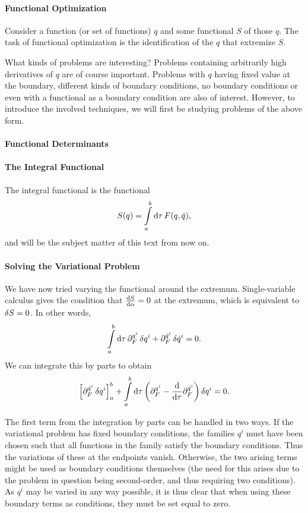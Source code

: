 \paragraph{Functional Optimization}
Consider a function (or set of functions) $q$ and some functional $S$ of those $q$. The task of functional optimization is the identification of the $q$ that extremize $S$.

What kinds of problems are interesting? Problems containing arbitrarily high derivatives of $q$ are of course important. Problems with $q$ having fixed value at the boundary, different kinds of boundary conditions, no boundary conditions or even with a functional as a boundary condition are also of interest. However, to introduce the involved techniques, we will first be studying problems of the above form.

\paragraph{Functional Determinants}

\paragraph{The Integral Functional}
The integral functional is the functional
\begin{align*}
	S(q) = \int\limits_{a}^{b}\dd{\tau}{F(q, \dot{q})},
\end{align*}
and will be the subject matter of this text from now on.

\paragraph{Solving the Variational Problem}
We have now tried varying the functional around the extremum. Single-variable calculus gives the condition that $\dv{S}{\alpha} = 0$ at the extremum, which is equivalent to $\var{S} = 0$. In other words,
\begin{align*}
	\int\limits_{a}^{b}\dd{\tau}{\ensuremath{\partial^{q^{i}}_{F}}\var{q^{i}} + \ensuremath{\partial^{\dot{q}^{i}}_{F}}\var{\dot{q}^{i}}} = 0.
\end{align*}
We can integrate this by parts to obtain
\begin{align*}
	\left[\partial^{\dot{q}^{i}}_{F}\var{q^{i}}\right]_{a}^{b} + \int\limits_{a}^{b}\dd{\tau}{\left(\ensuremath{\partial^{q^{i}}_{F}} - \dv{\tau}\ensuremath{\partial^{\dot{q}^{i}}_{F}}\right)\var{q^{i}}} = 0.
\end{align*}

The first term from the integration by parts can be handled in two ways. If the variational problem has fixed boundary conditions, the families $q^{i}$ must have been chosen such that all functions in the family satisfy the boundary conditions. Thus the variations of these at the endpoints vanish. Otherwise, the two arising terms might be used as boundary conditions themselves (the need for this arises due to the problem in question being second-order, and thus requiring two conditions). As $q^{i}$ may be varied in any way possible, it is thus clear that when using these boundary terms as conditions, they must be set equal to zero.

